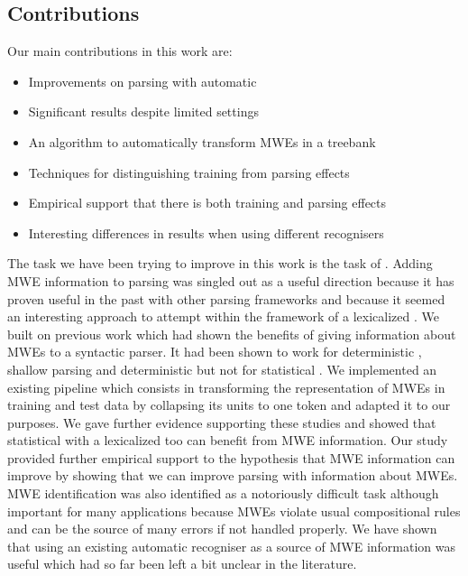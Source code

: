 \documentclass[output=paper]{langsci/langscibook}
\begin{document}
\subsection{Contributions}
Our main contributions in this work are:
\begin{itemize}
    \setlength\itemsep{0pt}
    \item Improvements on  parsing with automatic 
    \item Significant results despite limited settings
    \item An algorithm to automatically transform MWEs in a treebank
    \item Techniques for distinguishing training from parsing effects
    \item Empirical support that there is both training and parsing effects
    \item Interesting differences in results when using different recognisers
\end{itemize}
The task we have been trying to improve in this work is the task of . Adding MWE information to  parsing was singled out as a useful direction because it has proven useful in the past with other parsing frameworks and because it seemed an interesting approach to attempt within the framework of a lexicalized . We built on previous work which had shown the benefits of giving information about MWEs to a syntactic parser. It had been shown to work for deterministic , shallow parsing and deterministic  but not for statistical . We implemented an existing pipeline which consists in transforming the representation of MWEs in training and test data by collapsing its units to one token and adapted it to our purposes. We gave further evidence supporting these studies and showed that statistical  with a lexicalized  too can benefit from MWE information. Our study provided further empirical support to the hypothesis that MWE information can improve  by showing that we can improve  parsing with information about MWEs. \\
\indent MWE identification was also identified as a notoriously difficult task although important for many applications because MWEs violate usual compositional ru\-les and can be the source of many errors if not handled properly. We have shown that using an existing automatic recogniser as a source of MWE information was useful which had so far been left a bit unclear in the literature. \\
\end{document}

